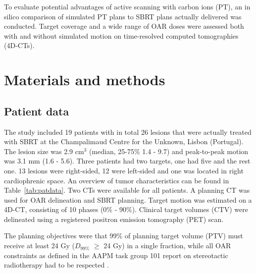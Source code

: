 \documentclass[type=dr, dr=rernat, acm$^3$entcolor=tud7b,colorbacktitle, bigchapter, openright, twoside, 12pt ]{tudthesis}
\begin{document}
To evaluate potential advantages of active scanning with carbon ions (PT), an in silico comparison of simulated PT plans to 
SBRT plans actually delivered was conducted. Target coverage and a wide range of OAR doses were assessed both with and without simulated motion on time-resolved computed tomographies (4D-CTs).



\section{Materials and methods}

\subsection{Patient data}

The study included 19 patients with in total 26 lesions that were actually treated with SBRT at the Champalimaud Centre for the Unknown, Lisbon (Portugal). The lesion size was 2.9 cm$^3$ (median, 25-75\% 1.4 - 9.7) and peak-to-peak motion was 3.1 mm (1.6 - 5.6). Three patients had two targets, one had five and the rest one. 13 lesions were right-sided, 12 were left-sided and one was located in right cardiophrenic space. An overview of tumor characteristics can be found in Table~\ref{tab:patdata}.
Two CTs were available for all patients. A planning CT was used for OAR delineation and SBRT planning. Target motion was estimated on a 4D-CT, consisting of 10 phases (0\% - 90\%). Clinical target volumes (CTV) were delineated using a registered positron emission tomography (PET) scan.

The planning objectives were that 99\% of planning target volume (PTV) must receive at least 24 Gy ($D_{99\%}$ $\geq$ 24 Gy) in a single fraction, while all OAR constraints as defined in the AAPM task group 101 report on stereotactic radiotherapy had to be respected \cite{Benedict2010}.
\end{document}

